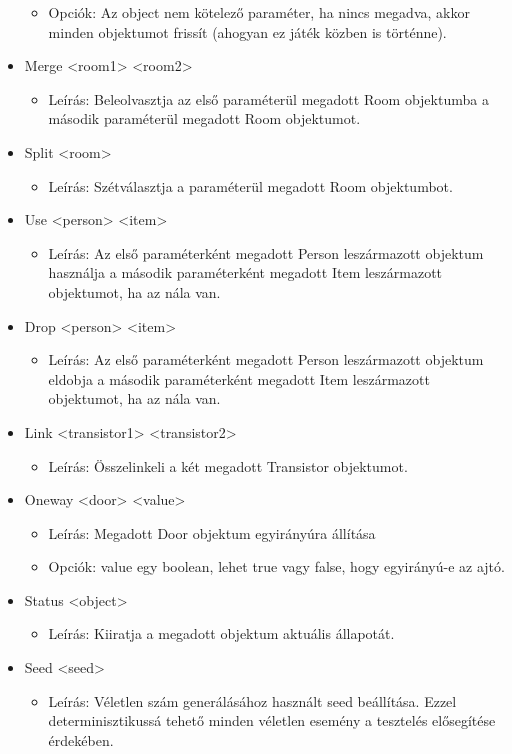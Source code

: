 \begin{itemize}
\begin{itemize}
        \item Opciók: Az object nem kötelező paraméter, ha nincs megadva, akkor minden objektumot frissít (ahogyan ez játék közben is történne).
    \end{itemize}
    \item Merge <room1> <room2>
    \begin{itemize}
        \item Leírás: Beleolvasztja az első paraméterül megadott Room objektumba a második paraméterül megadott Room objektumot.
    \end{itemize}
    \item Split <room>
    \begin{itemize}
        \item 
        Leírás: Szétválasztja a paraméterül megadott Room objektumbot.
    \end{itemize}
    \item Use <person> <item>
    \begin{itemize}
        \item Leírás: Az első paraméterként megadott Person leszármazott objektum használja a második paraméterként megadott Item leszármazott objektumot, ha az nála van.
    \end{itemize}
    \item Drop <person> <item>
    \begin{itemize}
        \item Leírás: Az első paraméterként megadott Person leszármazott objektum eldobja a második paraméterként megadott Item leszármazott objektumot, ha az nála van.
    \end{itemize}
    \item Link <transistor1> <transistor2>
    \begin{itemize}
        \item Leírás: Összelinkeli a két megadott Transistor objektumot.
    \end{itemize}
    \item Oneway <door> <value>
    \begin{itemize}
        \item Leírás: Megadott Door objektum egyirányúra állítása
        \item Opciók: value egy boolean, lehet true vagy false, hogy egyirányú-e az ajtó.
    \end{itemize}
    \item Status <object>
    \begin{itemize}
        \item Leírás: Kiiratja a megadott objektum aktuális állapotát.
    \end{itemize}
    \item Seed <seed>
    \begin{itemize}
        \item Leírás: Véletlen szám generálásához használt seed beállítása. Ezzel determinisztikussá tehető minden véletlen esemény a tesztelés elősegítése érdekében.
    \end{itemize}
\end{itemize}
